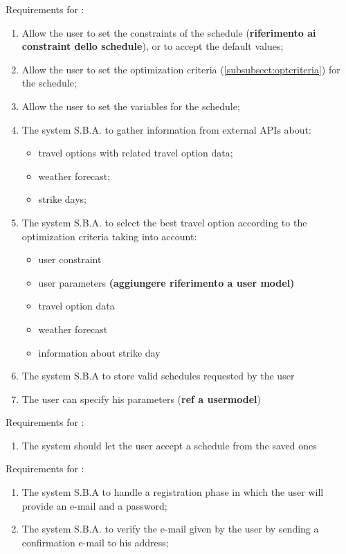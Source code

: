 Requirements for :
\begin{enumerate}[resume]
\renewcommand\labelenumi{\textbf{R\theenumi}}
\item Allow the user to set the constraints of the schedule (\textbf{riferimento ai constraint dello schedule}), or to accept the default values;
\item Allow the user to set the optimization criteria (\ref{subsubsect:optcriteria}) for the schedule;
\item Allow the user to set the variables for the schedule;
\item The system S.B.A. to gather information from external APIs about: 
	\begin{itemize}
		\item travel options with related travel option data; 
		\item weather forecast;
		\item strike days;
	\end{itemize}
\item The system S.B.A. to select the best travel option according to the optimization criteria taking into account:
	\begin{itemize}
		\item user constraint
		\item user parameters \textbf{(aggiungere riferimento a user model)}
		\item travel option data 
		\item weather forecast
		\item information about strike day
\end{itemize}
\item The system S.B.A to store valid schedules requested by the user
\item The user can specify his parameters (\textbf{ref a usermodel})
\end{enumerate}

Requirements for :
\begin{enumerate}[resume]
\renewcommand\labelenumi{\textbf{R\theenumi}}
\item The system should let the user accept a schedule from the saved ones
\end{enumerate}

Requirements for :
\begin{enumerate}[resume]
\renewcommand\labelenumi{\textbf{R\theenumi}}
\item The system S.B.A to handle a registration phase in which the user will provide an e-mail and a password;
\item The system S.B.A. to verify the e-mail given by the user by sending a confirmation e-mail to his address;
\end{enumerate}

